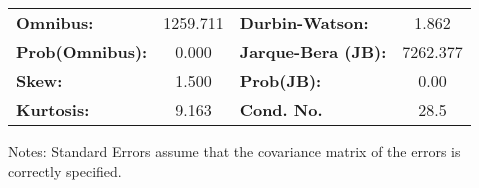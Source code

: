 \begin{center}
\begin{tabular}{lcccccc}
\bottomrule
\end{tabular}
\begin{tabular}{lclc}
\textbf{Omnibus:}       & 1259.711 & \textbf{  Durbin-Watson:     } &    1.862  \\
\textbf{Prob(Omnibus):} &   0.000  & \textbf{  Jarque-Bera (JB):  } & 7262.377  \\
\textbf{Skew:}          &   1.500  & \textbf{  Prob(JB):          } &     0.00  \\
\textbf{Kurtosis:}      &   9.163  & \textbf{  Cond. No.          } &     28.5  \\
\bottomrule
\end{tabular}
\end{center}

Notes: \newline
 [1] Standard Errors assume that the covariance matrix of the errors is correctly specified.